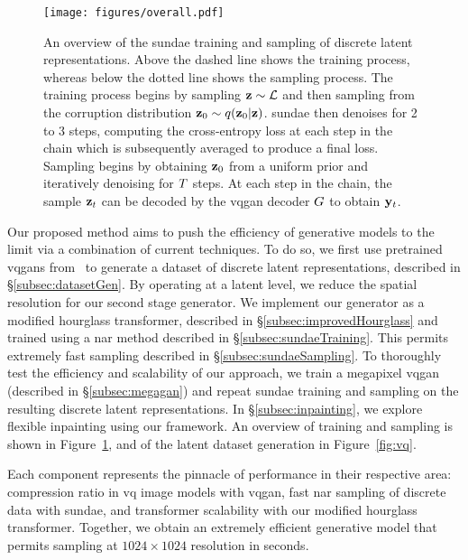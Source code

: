 \begin{figure}[ht]
    \centering
    \texttt{[image: figures/overall.pdf]}
    \caption{
        An overview of the \gls{sundae} training and sampling of discrete latent
        representations. Above the dashed line shows the training process,
        whereas below the dotted line shows the sampling process. The
        training process begins by sampling $\mathbf{z} \sim \mathcal{L}$ and
        then sampling from the corruption distribution $\mathbf{z}_0 \sim
        q(\mathbf{z}_0 \vert \mathbf{z})$. \Gls{sundae} then denoises for 2 to 3
        steps, computing the cross-entropy loss at each step in the chain which
        is subsequently averaged to produce a final loss. Sampling begins by
        obtaining $\mathbf{z}_0$ from a uniform prior and iteratively denoising for
        $T$ steps. At each step in the chain, the sample $\mathbf{z}_t$
        can be decoded by the \gls{vqgan} decoder $G$ to obtain
        $\mathbf{y}_t$.
    }
    \label{fig:overall}
\end{figure}

Our proposed method aims to push the efficiency of generative models to the
limit via a combination of current techniques. To do so, we first use pretrained
\glspl{vqgan} from~\cite{esser2021taming} to generate a dataset of
discrete latent representations, described in \S\ref{subsec:datasetGen}. By
operating at a latent level, we reduce the spatial resolution for our second
stage generator. We implement our generator as a modified hourglass transformer,
described in \S\ref{subsec:improvedHourglass} and trained using a \gls{nar}
method described in \S\ref{subsec:sundaeTraining}. This permits extremely fast
sampling described in \S\ref{subsec:sundaeSampling}. To thoroughly test the
efficiency and scalability of our approach, we train a megapixel \gls{vqgan}
(described in \S\ref{subsec:megagan}) and repeat \gls{sundae} training and
sampling on the resulting discrete latent representations. In
\S\ref{subsec:inpainting}, we explore flexible inpainting using our framework.
An overview of training and sampling is shown in Figure~\ref{fig:overall}, and
of the latent dataset generation in Figure~\ref{fig:vq}.

Each component represents the pinnacle of performance in their respective area:
compression ratio in \gls{vq} image models with \gls{vqgan}, fast \acrlong{nar}
sampling of discrete data with \gls{sundae}, and transformer scalability with
our modified hourglass transformer. Together, we obtain an extremely efficient
generative model that permits sampling at $1024 \times 1024$ resolution in
seconds.

